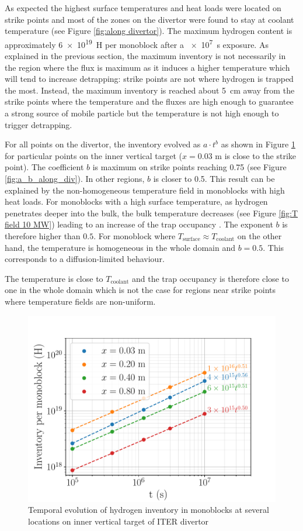 As expected the highest surface temperatures and heat loads were located on strike points and most of the zones on the divertor were found to stay at coolant temperature (see Figure \ref{fig:along divertor}).
The maximum hydrogen content is approximately \SI{6e19}{H} per monoblock after a \SI{e7}{s} exposure.
As explained in the previous section, the maximum inventory is not necessarily in the region where the flux is maximum as it induces a higher temperature which will tend to increase detrapping: strike points are not where hydrogen is trapped the most.
Instead, the maximum inventory is reached about \SI{5}{cm} away from the strike points where the temperature and the fluxes are high enough to guarantee a strong source of mobile particle but the temperature is not high enough to trigger detrapping.

For all points on the divertor, the inventory evolved as $a \cdot t^b$ as shown in Figure \ref{fig:inv_vs_time} for particular points on the inner vertical target ($x=0.03$ m is close to the strike point).
The coefficient $b$ is maximum on strike points reaching 0.75 (see Figure \ref{fig:a_b_along_div}).
In other regions, $b$ is closer to 0.5.
This result can be explained by the non-homogeneous temperature field in monoblocks with high heat loads.
For monoblocks with a high surface temperature, as hydrogen penetrates deeper into the bulk, the bulk temperature decreases (see Figure \ref{fig:T field 10 MW}) leading to an increase of the trap occupancy \cite{hodille_estimation_2017}.
The exponent $b$ is therefore higher than $0.5$.
For monoblock where $T_\mathrm{surface} \approx T_\mathrm{coolant}$ on the other hand, the temperature is homogeneous in the whole domain and $b=0.5$.
This corresponds to a diffusion-limited behaviour.

The temperature is close to $T_\mathrm{coolant}$ and the trap occupancy is therefore close to one in the whole domain which is not the case for regions near strike points where temperature fields are non-uniform.

\begin{figure} [t]
    \centering
    \includegraphics[width=0.5\linewidth]{Figures/Chapter3/monoblocks/parametric_study/inventory_vs_time.pdf}
    \caption{Temporal evolution of hydrogen inventory in monoblocks at several locations on inner vertical target of ITER divertor}
    \label{fig:inv_vs_time}
\end{figure}


